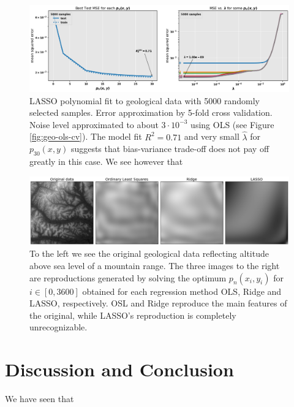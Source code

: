 \documentclass[]{article}
\begin{document}
\begin{figure}[!htb]
	\centering
	\includegraphics[width=1\linewidth]{./results/geo-lasso-cv.png}
	\caption{LASSO polynomial fit to geological data with 5000 randomly selected samples. Error approximation by 5-fold cross validation. Noise level approximated to about $3 \cdot 10^{-3}$ using OLS (see Figure \ref{fig:geo-ols-cv}). The model fit $R^2 = 0.71$ and very small $\hat{\lambda}$ for $p_{30}(x,y)$ suggests that bias-variance trade-off does not pay off greatly in this case. We see however that }
	\label{fig:geo-lasso-cv}
\end{figure}

\begin{figure}[!htb]
	\centering
	\includegraphics[width=1\linewidth]{./results/geo-data.png}
	\caption{To the left we see the original geological data reflecting altitude above sea level of a mountain range. The three images to the right are reproductions generated by solving the optimum $p_{n}(x_i,y_i)$ for $i \in [0,3600]$ obtained for each regression method OLS, Ridge and LASSO, respectively. OSL and Ridge reproduce the main features of the original, while LASSO's reproduction is completely unrecognizable.}
	\label{fig:geo-data}
\end{figure}

\section{Discussion and Conclusion} \label{conclusion}
We have seen that 

\clearpage


\end{document}
